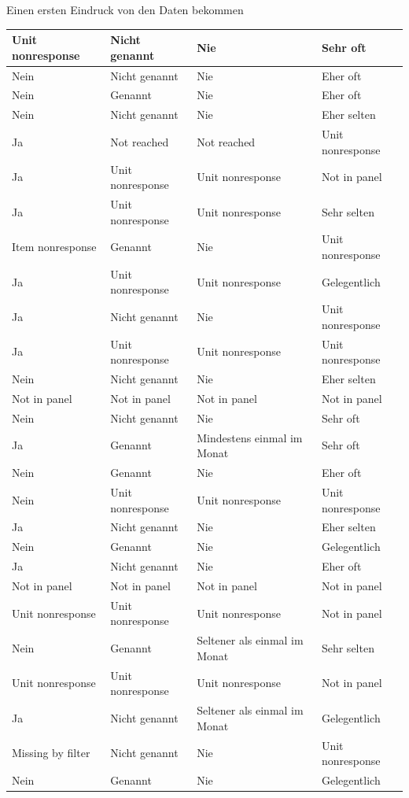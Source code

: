 \documentclass[ignorenonframetext,]{beamer}
\begin{document}
\begin{frame}{Einen ersten Eindruck von den Daten bekommen}
\begin{tabular}{l|l|l|l}
\hline
Unit nonresponse & Nicht genannt & Nie & Sehr oft\\
\hline
Nein & Nicht genannt & Nie & Eher oft\\
\hline
Nein & Genannt & Nie & Eher oft\\
\hline
Nein & Nicht genannt & Nie & Eher selten\\
\hline
Ja & Not reached & Not reached & Unit nonresponse\\
\hline
Ja & Unit nonresponse & Unit nonresponse & Not in panel\\
\hline
Ja & Unit nonresponse & Unit nonresponse & Sehr selten\\
\hline
Item nonresponse & Genannt & Nie & Unit nonresponse\\
\hline
Ja & Unit nonresponse & Unit nonresponse & Gelegentlich\\
\hline
Ja & Nicht genannt & Nie & Unit nonresponse\\
\hline
Ja & Unit nonresponse & Unit nonresponse & Unit nonresponse\\
\hline
Nein & Nicht genannt & Nie & Eher selten\\
\hline
Not in panel & Not in panel & Not in panel & Not in panel\\
\hline
Nein & Nicht genannt & Nie & Sehr oft\\
\hline
Ja & Genannt & Mindestens einmal im Monat & Sehr oft\\
\hline
Nein & Genannt & Nie & Eher oft\\
\hline
Nein & Unit nonresponse & Unit nonresponse & Unit nonresponse\\
\hline
Ja & Nicht genannt & Nie & Eher selten\\
\hline
Nein & Genannt & Nie & Gelegentlich\\
\hline
Ja & Nicht genannt & Nie & Eher oft\\
\hline
Not in panel & Not in panel & Not in panel & Not in panel\\
\hline
Unit nonresponse & Unit nonresponse & Unit nonresponse & Not in panel\\
\hline
Nein & Genannt & Seltener als einmal im Monat & Sehr selten\\
\hline
Unit nonresponse & Unit nonresponse & Unit nonresponse & Not in panel\\
\hline
Ja & Nicht genannt & Seltener als einmal im Monat & Gelegentlich\\
\hline
Missing by filter & Nicht genannt & Nie & Unit nonresponse\\
\hline
Nein & Genannt & Nie & Gelegentlich\\

\end{tabular}
\end{frame}
\end{document}
